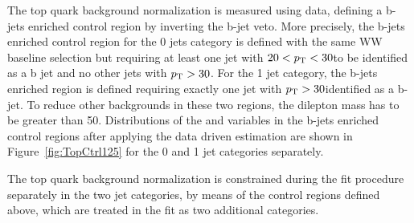The top quark background normalization is measured using data, defining a b-jets enriched control region by inverting the b-jet veto. More precisely, the b-jets enriched control region for the 0 jets category is defined with the same WW baseline selection but requiring at least one jet with $20<p_\mathrm{T}<30$\GeV to be identified as a b jet and no other jets with $p_\mathrm{T} > 30$\GeV. For the 1 jet category, the b-jets enriched region is defined requiring exactly one jet with $p_\mathrm{T}>30$\GeV identified as a b-jet.
To reduce other backgrounds in these two regions, the dilepton mass has to be greater than 50\GeV. Distributions of the \mll and \mt variables in the b-jets enriched control regions after applying the data driven estimation are shown in Figure~\ref{fig:TopCtrl125} for the 0 and 1 jet categories separately.

The top quark background normalization is constrained during the fit procedure separately in the two jet categories, by means of the control regions defined above, which are treated in the fit as two additional categories. 

